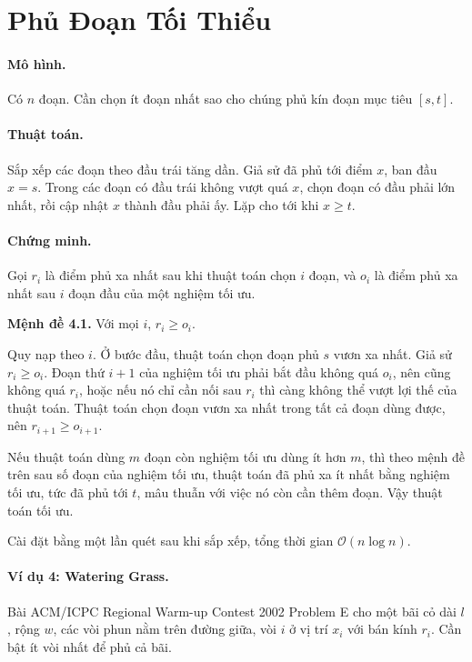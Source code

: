 \documentclass[11pt]{article}
\newcommand{\Oh}{\mathcal{O}}
\begin{document}
\section{Phủ Đoạn Tối Thiểu}

\paragraph{Mô hình.}
Có \(n\) đoạn. Cần chọn ít đoạn nhất sao cho chúng phủ kín đoạn mục tiêu
\([s,t]\).

\paragraph{Thuật toán.}
Sắp xếp các đoạn theo đầu trái tăng dần. Giả sử đã phủ tới điểm \(x\), ban đầu
\(x=s\). Trong các đoạn có đầu trái không vượt quá \(x\), chọn đoạn có đầu
phải lớn nhất, rồi cập nhật \(x\) thành đầu phải ấy. Lặp cho tới khi \(x\ge t\).

\paragraph{Chứng minh.}
Gọi \(r_i\) là điểm phủ xa nhất sau khi thuật toán chọn \(i\) đoạn, và \(o_i\)
là điểm phủ xa nhất sau \(i\) đoạn đầu của một nghiệm tối ưu.

\textbf{Mệnh đề 4.1.} Với mọi \(i\), \(r_i\ge o_i\).

Quy nạp theo \(i\). Ở bước đầu, thuật toán chọn đoạn phủ \(s\) vươn xa nhất.
Giả sử \(r_i\ge o_i\). Đoạn thứ \(i+1\) của nghiệm tối ưu phải bắt đầu không
quá \(o_i\), nên cũng không quá \(r_i\), hoặc nếu nó chỉ cần nối sau \(r_i\)
thì càng không thể vượt lợi thế của thuật toán. Thuật toán chọn đoạn vươn xa
nhất trong tất cả đoạn dùng được, nên \(r_{i+1}\ge o_{i+1}\).

Nếu thuật toán dùng \(m\) đoạn còn nghiệm tối ưu dùng ít hơn \(m\), thì theo
mệnh đề trên sau số đoạn của nghiệm tối ưu, thuật toán đã phủ xa ít nhất bằng
nghiệm tối ưu, tức đã phủ tới \(t\), mâu thuẫn với việc nó còn cần thêm đoạn.
Vậy thuật toán tối ưu.

Cài đặt bằng một lần quét sau khi sắp xếp, tổng thời gian \(\Oh(n\log n)\).

\paragraph{Ví dụ 4: Watering Grass.}
Bài ACM/ICPC Regional Warm-up Contest 2002 Problem E cho một bãi cỏ dài \(l\),
rộng \(w\), các vòi phun nằm trên đường giữa, vòi \(i\) ở vị trí \(x_i\) với
bán kính \(r_i\). Cần bật ít vòi nhất để phủ cả bãi.
\end{document}
